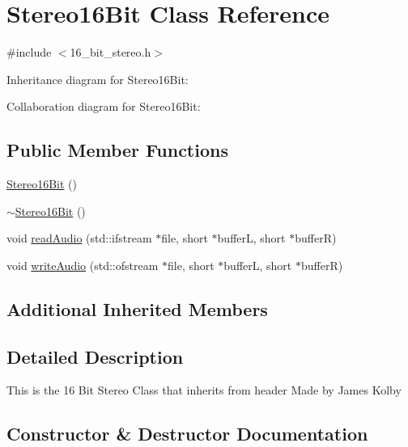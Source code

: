 \hypertarget{classStereo16Bit}{}\section{Stereo16\+Bit Class Reference}
\label{classStereo16Bit}


{\ttfamily \#include $<$16\+\_\+bit\+\_\+stereo.\+h$>$}



Inheritance diagram for Stereo16\+Bit\+:


Collaboration diagram for Stereo16\+Bit\+:
\subsection*{Public Member Functions}
\begin{DoxyCompactItemize}
\item 
\hyperlink{classStereo16Bit_aaeaeea1f396e92d462bd9aab39c80bc7}{Stereo16\+Bit} ()
\item 
\hyperlink{classStereo16Bit_a2b686fbed213e75b3f1d5f60c3897a85}{$\sim$\+Stereo16\+Bit} ()
\item 
void \hyperlink{classStereo16Bit_a6411217aab584edb8db900d0d5b9d8a0}{read\+Audio} (std\+::ifstream $\ast$file, short $\ast$bufferL, short $\ast$bufferR)
\item 
void \hyperlink{classStereo16Bit_a57ede5ea6c6a3aa7ff15ee04c3011ffb}{write\+Audio} (std\+::ofstream $\ast$file, short $\ast$bufferL, short $\ast$bufferR)
\end{DoxyCompactItemize}
\subsection*{Additional Inherited Members}


\subsection{Detailed Description}
This is the 16 Bit Stereo Class that inherits from header Made by James Kolby 

\subsection{Constructor \& Destructor Documentation}
\mbox{\label{classStereo16Bit_aaeaeea1f396e92d462bd9aab39c80bc7}} 
